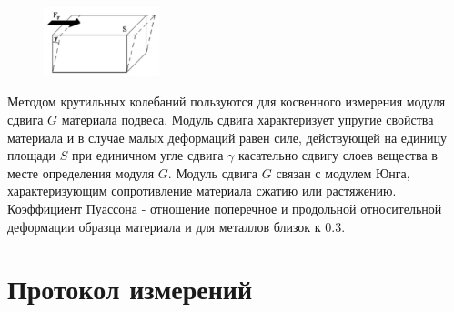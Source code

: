 \documentclass[a4paper,12pt]{report}
\begin{document}
\begin{figure}
    \includegraphics[width=0.3\textwidth]{sdvig.jpg}
    \label{ris:image2}
\end{figure}

Методом крутильных колебаний пользуются для косвенного измерения модуля сдвига $G$ материала подвеса. 
Модуль сдвига характеризует упругие свойства материала и в случае малых деформаций равен силе, действующей на единицу площади $S$ при единичном угле сдвига $\gamma$ касательно сдвигу слоев вещества в месте определения модуля $G$.
Модуль сдвига $G$ связан с модулем Юнга, характеризующим сопротивление материала сжатию или растяжению. Коэффициент Пуассона - отношение поперечное и продольной относительной деформации образца материала и для металлов близок к 0.3. 

\newpage

\section*{Протокол измерений}

\begin{flushleft}
    
\end{flushleft}

\end{document}
